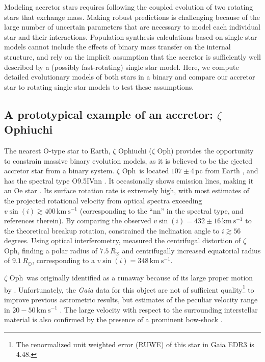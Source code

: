 \documentclass[twocolumn,twocolappendix,trackchanges]{aastex63}
\newcommand{\kms}{{\mathrm{km\ s^{-1}}}}
\newcommand{\zoph}{$\zeta$ Oph}
\begin{document}
Modeling accretor stars requires following the coupled evolution of
two rotating stars that exchange mass. Making robust predictions is
challenging because of the large number of uncertain parameters that are necessary
to model each individual star and their interactions. Population
synthesis calculations based on single star models cannot include the
effects of binary mass transfer on the internal structure, and rely on
the implicit assumption that the accretor is sufficiently well
described by a (possibly fast-rotating) single star model. Here, we
compute detailed evolutionary models of both stars in a binary and
compare our accretor star to rotating single star models to test these
assumptions.

\subsection{A prototypical example of an accretor: $\zeta$ Ophiuchi}

The nearest O-type star to Earth, $\zeta$
Ophiuchi %
(\zoph) provides the opportunity to constrain massive binary evolution
models, as it is believed to be the ejected accretor star from a binary system.
 \zoph\ is located $107\pm4$\,pc from Earth
\citep[][and references therein]{neuhauser:20}, and has the spectral type
O9.5{\rm IVnn} \citep{sota:14}. It occasionally shows emission lines,
making it an Oe star \citep{walker:79, vink:09}. Its surface rotation
rate is extremely high, with most estimates of the projected
rotational velocity from optical spectra exceeding
$v\sin(i)\gtrsim 400\,\kms$ (corresponding to the ``nn'' in the
spectral type, \citealt{zehe:18} and references therein). By comparing
the observed $v\sin(i)=432\pm16\,\kms$ to the theoretical breakup
rotation, \cite{zehe:18} constrained the inclination angle to
$i\gtrsim 56$\,degrees. Using optical interferometry, \cite{gordon:18}
measured the centrifugal distortion of \zoph, finding a polar radius
of $7.5\,R_\odot$ and centrifugally increased equatorial radius of
$9.1\,R_\odot$, corresponding to a $v\sin(i)=348\,\kms$.

\zoph\ was originally
identified as a runaway because of its large proper motion by
\cite{blaauw:52}. Unfortunately, the \emph{Gaia} data for this object
are not of sufficient quality\footnote{The renormalized unit weighted
  error (RUWE) of this star in Gaia EDR3 is 4.48.} to improve previous astrometric results,
but estimates of the peculiar velocity range in $20-50\,\kms$
\citep[e.g.,][]{zehe:18, neuhauser:20}. The large velocity with
respect to the surrounding interstellar material is also confirmed by the
presence of a prominent bow-shock \citep[e.g.,][]{bodensteiner:18}.
\end{document}
